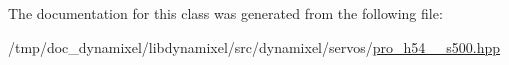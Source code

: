 The documentation for this class was generated from the following file\+:\begin{DoxyCompactItemize}
\item 
/tmp/doc\+\_\+dynamixel/libdynamixel/src/dynamixel/servos/\hyperlink{pro__h54__100__s500_8hpp}{pro\+\_\+h54\+\_\+\_\+s500.\+hpp}\end{DoxyCompactItemize}
